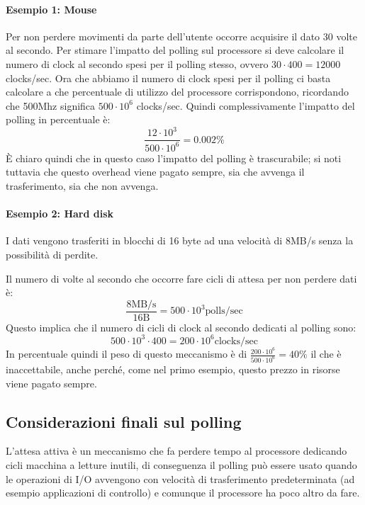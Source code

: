 \documentclass[class=book, crop=false, oneside]{standalone}
\begin{document}
\paragraph{Esempio 1: Mouse} Per non perdere movimenti da parte dell'utente occorre acquisire il dato 30 volte al secondo. Per stimare l'impatto del polling sul processore si deve calcolare il numero di clock al secondo spesi per il polling stesso, ovvero \(30\cdot 400 = 12000\) clocks/sec. Ora che abbiamo il numero di clock spesi per il polling ci basta calcolare a che percentuale di utilizzo del processore corrispondono, ricordando che 500Mhz significa \(500\cdot10^{6}\) clocks/sec. Quindi complessivamente l'impatto del polling in percentuale è:
\begin{equation*}
	\frac{12\cdot 10^3}{500\cdot 10^6}=0.002\%
\end{equation*}
È chiaro quindi che in questo caso l'impatto del polling è trascurabile; si noti tuttavia che questo overhead viene pagato sempre, sia che avvenga il trasferimento, sia che non avvenga.

\paragraph{Esempio 2: Hard disk} I dati vengono trasferiti in blocchi di 16 byte ad una velocità di \unit{8}{MB/s} senza la possibilità di perdite.

Il numero di volte al secondo che occorre fare cicli di attesa per non perdere dati è:
\begin{equation*}
	\frac{8\textrm{MB/s}}{16\textrm{B}} = 500\cdot10^{3} \textrm{polls/sec}
\end{equation*}
Questo implica che il numero di cicli di clock al secondo dedicati al polling sono:
\begin{equation*}
	500\cdot10^{3}\cdot400 = 200\cdot10^{6} \textrm{clocks/sec}
\end{equation*}
In percentuale quindi il peso di questo meccanismo è di \(\frac{200\cdot10^6}{500\cdot10^6}=40\%\) il che è inaccettabile, anche perché, come nel primo esempio, questo prezzo in risorse viene pagato sempre.

\subsection{Considerazioni finali sul polling}
L'attesa attiva è un meccanismo che fa perdere tempo al processore dedicando cicli macchina a letture inutili, di conseguenza il polling può essere usato quando le operazioni di I/O avvengono con velocità di trasferimento predeterminata (ad esempio applicazioni di controllo) e comunque il processore ha poco altro da fare.
\end{document}
